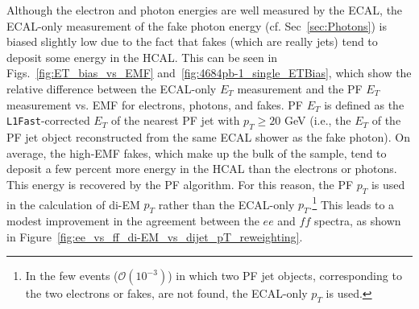 \documentclass[dissertation_bw.tex]{subfiles}
\begin{document}
Although the electron and photon energies are well measured by the ECAL, the ECAL-only measurement of the fake photon energy (cf. Sec~\ref{sec:Photons}) is biased slightly low due to the fact that fakes (which are really jets) tend to deposit some energy in the HCAL.  This can be seen in Figs.~\ref{fig:ET_bias_vs_EMF} and~\ref{fig:4684pb-1_single_ETBias}, which show the relative difference between the ECAL-only $E_{T}$ measurement and the PF $E_{T}$ measurement vs. EMF for electrons, photons, and fakes.  PF $E_{T}$ is defined as the \verb+L1Fast+-corrected $E_{T}$ of the nearest PF jet with $p_{T} \geq 20$ GeV (i.e., the $E_{T}$ of the PF jet object reconstructed from the same ECAL shower as the fake photon).  On average, the high-EMF fakes, which make up the bulk of the sample, tend to deposit a few percent more energy in the HCAL than the electrons or photons.  This energy is recovered by the PF algorithm.  For this reason, the PF $p_{T}$ is used in the calculation of di-EM $p_{T}$ rather than the ECAL-only $p_{T}$.\footnote{In the few events ($\mathcal{O}(10^{-3})$) in which two PF jet objects, corresponding to the two electrons or fakes, are not found, the ECAL-only $p_{T}$ is used.}  This leads to a modest improvement in the agreement between the $ee$ and $\mathit{ff}$ \MET spectra, as shown in Figure~\ref{fig:ee_vs_ff_di-EM_vs_dijet_pT_reweighting}.
\end{document}
